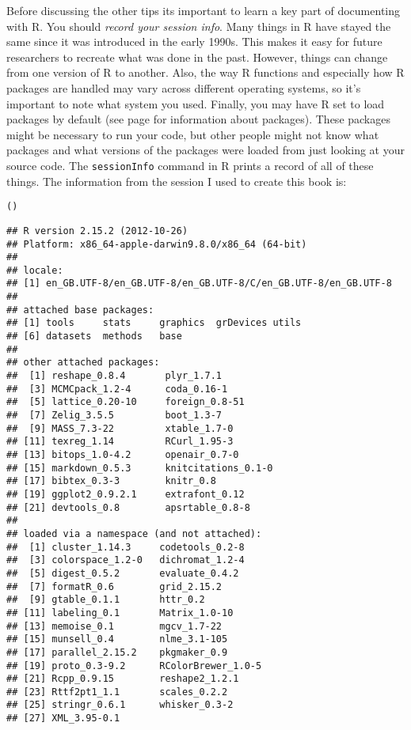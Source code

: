 {Before discussing the other tips its important to learn a key part of documenting with R. You should \emph{record your session info}. Many things in R have stayed the same since it was introduced in the early 1990s. This makes it easy for future researchers to recreate what was done in the past. However, things can change from one version of R to another. Also, the way R functions and especially how R packages are handled may vary across different operating systems, so it's important to note what system you used. Finally, you may have R set to load packages by default (see page \pageref{Packages} for information about packages). These packages might be necessary to run your code, but other people might not know what packages and what versions of the packages were loaded from just looking at your source code. The \texttt{sessionInfo} command in R prints a record of all of these things. The information from the session I used to create this book is:

{\footnotesize{
\begin{knitrout}
\color{fgcolor}\begin{kframe}
\begin{alltt}
()
\end{alltt}
\begin{verbatim}
## R version 2.15.2 (2012-10-26)
## Platform: x86_64-apple-darwin9.8.0/x86_64 (64-bit)
## 
## locale:
## [1] en_GB.UTF-8/en_GB.UTF-8/en_GB.UTF-8/C/en_GB.UTF-8/en_GB.UTF-8
## 
## attached base packages:
## [1] tools     stats     graphics  grDevices utils    
## [6] datasets  methods   base     
## 
## other attached packages:
##  [1] reshape_0.8.4       plyr_1.7.1         
##  [3] MCMCpack_1.2-4      coda_0.16-1        
##  [5] lattice_0.20-10     foreign_0.8-51     
##  [7] Zelig_3.5.5         boot_1.3-7         
##  [9] MASS_7.3-22         xtable_1.7-0       
## [11] texreg_1.14         RCurl_1.95-3       
## [13] bitops_1.0-4.2      openair_0.7-0      
## [15] markdown_0.5.3      knitcitations_0.1-0
## [17] bibtex_0.3-3        knitr_0.8          
## [19] ggplot2_0.9.2.1     extrafont_0.12     
## [21] devtools_0.8        apsrtable_0.8-8    
## 
## loaded via a namespace (and not attached):
##  [1] cluster_1.14.3     codetools_0.2-8   
##  [3] colorspace_1.2-0   dichromat_1.2-4   
##  [5] digest_0.5.2       evaluate_0.4.2    
##  [7] formatR_0.6        grid_2.15.2       
##  [9] gtable_0.1.1       httr_0.2          
## [11] labeling_0.1       Matrix_1.0-10     
## [13] memoise_0.1        mgcv_1.7-22       
## [15] munsell_0.4        nlme_3.1-105      
## [17] parallel_2.15.2    pkgmaker_0.9      
## [19] proto_0.3-9.2      RColorBrewer_1.0-5
## [21] Rcpp_0.9.15        reshape2_1.2.1    
## [23] Rttf2pt1_1.1       scales_0.2.2      
## [25] stringr_0.6.1      whisker_0.3-2     
## [27] XML_3.95-0.1
\end{verbatim}
\end{kframe}
\end{knitrout}

}}}
